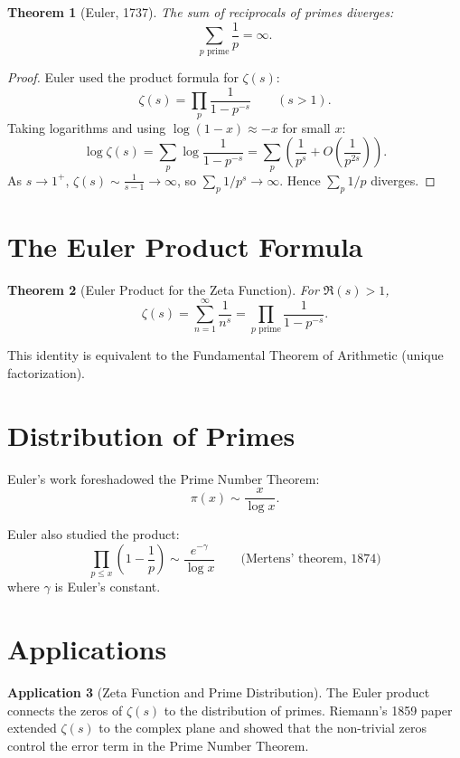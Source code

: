 \documentclass[11pt,a4paper,twoside]{book}
\theoremstyle{eulerstyle}
\newtheorem{theorem}{Theorem}[chapter]
\theoremstyle{definition}
\newtheorem{application}[theorem]{Application}
\begin{document}
\begin{theorem}[Euler, 1737]
The sum of reciprocals of primes diverges:
\[
\sum_{p \text{ prime}} \frac{1}{p} = \infty.
\]
\end{theorem}

\begin{proof}
Euler used the product formula for $\zeta(s)$:
\[
\zeta(s) = \prod_{p} \frac{1}{1 - p^{-s}} \qquad (s > 1).
\]
Taking logarithms and using $\log(1-x) \approx -x$ for small $x$:
\[
\log \zeta(s) = \sum_p \log \frac{1}{1-p^{-s}} = \sum_p \left( \frac{1}{p^s} + O\left(\frac{1}{p^{2s}}\right) \right).
\]
As $s \to 1^+$, $\zeta(s) \sim \frac{1}{s-1} \to \infty$, so $\sum_p 1/p^s \to \infty$. Hence $\sum_p 1/p$ diverges.
\end{proof}

\section{The Euler Product Formula}

\begin{theorem}[Euler Product for the Zeta Function]
For $\Re(s) > 1$,
\[
\zeta(s) = \sum_{n=1}^\infty \frac{1}{n^s} = \prod_{p \text{ prime}} \frac{1}{1 - p^{-s}}.
\]
\end{theorem}

This identity is equivalent to the Fundamental Theorem of Arithmetic (unique factorization).

\section{Distribution of Primes}

Euler's work foreshadowed the Prime Number Theorem:
\[
\pi(x) \sim \frac{x}{\log x}.
\]

Euler also studied the product:
\[
\prod_{p \le x} \left(1 - \frac{1}{p}\right) \sim \frac{e^{-\gamma}}{\log x} \qquad \text{(Mertens' theorem, 1874)}
\]
where $\gamma$ is Euler's constant.

\section{Applications}

\begin{application}[Zeta Function and Prime Distribution]
The Euler product connects the zeros of $\zeta(s)$ to the distribution of primes.
Riemann's 1859 paper extended $\zeta(s)$ to the complex plane and showed that the non-trivial zeros control the error term in the Prime Number Theorem.
\end{application}
\end{document}

